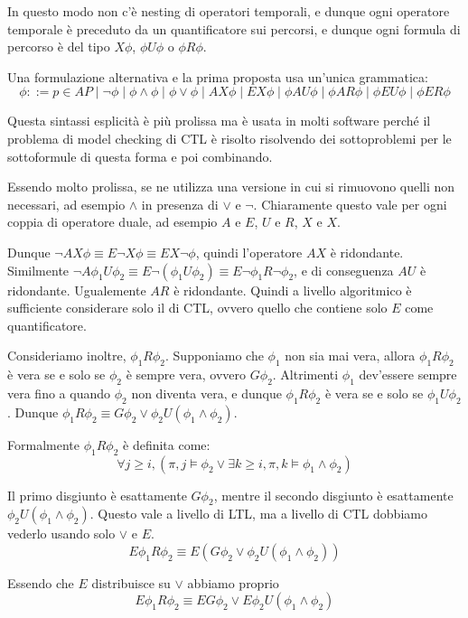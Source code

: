 In questo modo non c'è nesting di operatori temporali, e dunque ogni operatore temporale è preceduto da un quantificatore sui percorsi, e dunque ogni formula di percorso è del tipo \(X\phi\), \(\phi U \phi\) o \(\phi R \phi\).

Una formulazione alternativa e la prima proposta usa un'unica grammatica:
\[\phi ::= p \in AP \mid \neg \phi \mid \phi \land \phi \mid \phi \lor \phi \mid AX\phi \mid EX\phi \mid \phi AU \phi \mid \phi AR \phi \mid \phi EU \phi \mid \phi ER \phi\]

Questa sintassi esplicità è più prolissa ma è usata in molti software perché il problema di model checking di CTL è risolto risolvendo dei sottoproblemi per le sottoformule di questa forma e poi combinando.

Essendo molto prolissa, se ne utilizza una versione in cui si rimuovono quelli non necessari, ad esempio \(\land\) in presenza di \(\lor\) e \(\neg\).
Chiaramente questo vale per ogni coppia di operatore duale, ad esempio \(A\) e \(E\), \(U\) e \(R\), \(X\) e \(X\).

Dunque \(\neg AX\phi \equiv E\neg X \phi \equiv EX \neg \phi\), quindi l'operatore \(AX\) è ridondante.
Similmente \(\neg A \phi_1 U \phi_2 \equiv E \neg (\phi_1 U \phi_2) \equiv E \neg \phi_1 R \neg \phi_2\), e di conseguenza \(AU\) è ridondante. Ugualemente \(AR\) è ridondante. Quindi a livello algoritmico è sufficiente considerare solo il  di CTL\@, ovvero quello che contiene solo \(E\) come quantificatore.

Consideriamo inoltre, \(\phi_1 R \phi_2\). Supponiamo che \(\phi_1\) non sia mai vera, allora \(\phi_1 R \phi_2\) è vera se e solo se \(\phi_2\) è sempre vera, ovvero \(G\phi_2\). Altrimenti \(\phi_1\) dev'essere sempre vera fino a quando \(\phi_2\) non diventa vera, e dunque \(\phi_1 R \phi_2\) è vera se e solo se \(\phi_1 U \phi_2\). Dunque \(\phi_1 R \phi_2 \equiv G \phi_2 \lor \phi_2 U (\phi_1 \land \phi_2)\).

Formalmente \(\phi_1 R \phi_2\) è definita come:
\[\forall j \geq i, (\pi, j \models \phi_2 \lor \exists k \geq i, \pi, k \models \phi_1 \land \phi_2)\]

Il primo disgiunto è esattamente \(G\phi_2\), mentre il secondo disgiunto è esattamente \(\phi_2 U (\phi_1 \land \phi_2)\).
Questo vale a livello di LTL, ma a livello di CTL dobbiamo vederlo usando solo \(\lor\) e \(E\).
\[E \phi_1 R \phi_2 \equiv E(G\phi_2 \lor \phi_2 U(\phi_1 \land \phi_2))\]

Essendo che \(E\) distribuisce su \(\lor\) abbiamo proprio
\[E \phi_1 R \phi_2 \equiv E G\phi_2 \lor E \phi_2 U(\phi_1 \land \phi_2)\]

